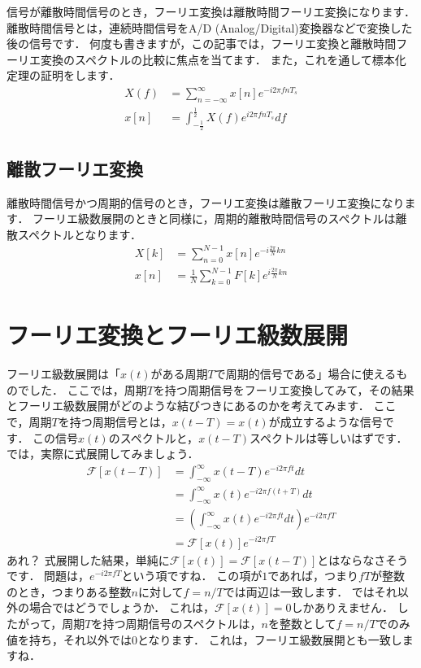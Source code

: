 信号が離散時間信号のとき，フーリエ変換は離散時間フーリエ変換になります．
離散時間信号とは，連続時間信号をA/D (Analog/Digital)変換器などで変換した後の信号です．
何度も書きますが，この記事では，フーリエ変換と離散時間フーリエ変換のスペクトルの比較に焦点を当てます．
また，これを通して標本化定理の証明をします．
\begin{align}
X(f) &= \sum_{n=-\infty}^{\infty} x[n] e^{-i 2 \pi fnT_s} \\
x[n] &= \int_{-\frac{1}{2}}^{\frac{1}{2}} X(f)e^{i2\pi fnT_s} df
\end{align}


\subsection{離散フーリエ変換}

離散時間信号かつ周期的信号のとき，フーリエ変換は離散フーリエ変換になります．
フーリエ級数展開のときと同様に，周期的離散時間信号のスペクトルは離散スペクトルとなります．
\begin{align}
X[k] &= \sum_{n=0}^{N-1} x[n] e^{-i \frac{2\pi}{N} kn} \\
x[n] &= \frac{1}{N} \sum_{k=0}^{N-1} F[k] e^{i \frac{2\pi}{N} kn}
\end{align}


\section{フーリエ変換とフーリエ級数展開}

フーリエ級数展開は「$x(t)$がある周期$T$で周期的信号である」場合に使えるものでした．
ここでは，周期$T$を持つ周期信号をフーリエ変換してみて，その結果とフーリエ級数展開がどのような結びつきにあるのかを考えてみます．
ここで，周期$T$を持つ周期信号とは，$x(t - T) = x(t)$が成立するような信号です．
この信号$x(t)$のスペクトルと，$x(t - T)$スペクトルは等しいはずです．
では，実際に式展開してみましょう．
\begin{align}
\mathcal{F}[x(t-T)]     &= \int_{-\infty}^{\infty} x(t-T) e^{-i2\pi f t} dt \nonumber\\
                        &= \int_{-\infty}^{\infty} x(t) e^{-i2\pi f(t + T)} dt  \nonumber\\
                        &= \left(\int_{-\infty}^{\infty} x(t) e^{-i2\pi ft} dt \right) e^{-i2\pi fT}  \nonumber\\
                        &= \mathcal{F}[x(t)] e^{-i2\pi fT}
\end{align}
あれ？
式展開した結果，単純に$\mathcal{F}[x(t)] = \mathcal{F}[x(t-T)]$とはならなさそうです．
問題は，$e^{-i2\pi fT}$という項ですね．
この項が$1$であれば，つまり$fT$が整数のとき，つまりある整数$n$に対して$f=n/T$では両辺は一致します．
ではそれ以外の場合ではどうでしょうか．
これは，$\mathcal{F}[x(t)]=0$しかありえません．
したがって，周期$T$を持つ周期信号のスペクトルは，$n$を整数として$f=n/T$でのみ値を持ち，それ以外では$0$となります．
これは，フーリエ級数展開とも一致しますね．

